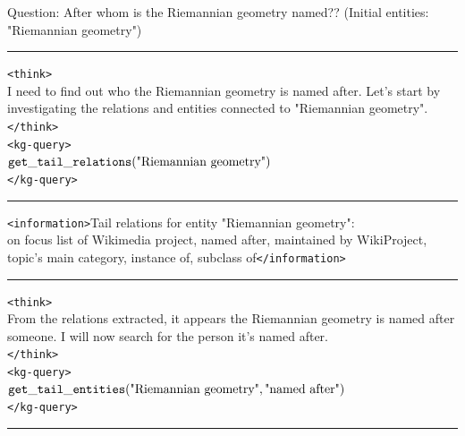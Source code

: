 \begin{table}[H]
\centering
\caption{Example \framework{} response in . \textcolor{blue}{Blue} denotes responses generated by the \framework{} agent.}
\begin{reasonbox}[title=\framework{} Response Example - \dataset{QALD10en}]
Question: After whom is the Riemannian geometry named?? (Initial entities: "Riemannian geometry") \\
\vspace{0.5em}\hrule\vspace{0.5em}

\begin{blueblock}
\texttt{<think>} \\
I need to find out who the Riemannian geometry is named after. Let's start by investigating the relations and entities connected to "Riemannian geometry". \\
\texttt{</think>} \\
\texttt{<kg-query>} \\
$\mathtt{get\_tail\_relations}(\text{"Riemannian geometry"})$ \\
\texttt{</kg-query>}
\end{blueblock}

\vspace{0.5em}\hrule\vspace{0.5em}

\texttt{<information>}Tail relations for entity "Riemannian geometry": \\
on focus list of Wikimedia project, named after, maintained by WikiProject, topic's main category, instance of, subclass of\texttt{</information>}

\vspace{0.5em}\hrule\vspace{0.5em}

\begin{blueblock}
\texttt{<think>} \\
From the relations extracted, it appears the Riemannian geometry is named after someone. I will now search for the person it's named after. \\
\texttt{</think>} \\
\texttt{<kg-query>} \\
$\mathtt{get\_tail\_entities}(\text{"Riemannian geometry"}, \text{"named after"})$ \\
\texttt{</kg-query>}
\end{blueblock}

\vspace{0.5em}\hrule\vspace{0.5em}


\end{reasonbox}
\end{table}
